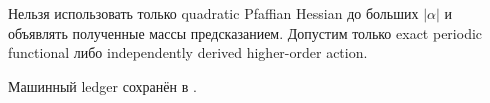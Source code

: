 \begin{nogocriterion}
Нельзя использовать только quadratic Pfaffian Hessian до больших
\(|\alpha|\) и объявлять полученные массы предсказанием. Допустим только exact
periodic functional либо independently derived higher-order action.
\end{nogocriterion}

Машинный ledger сохранён в
.